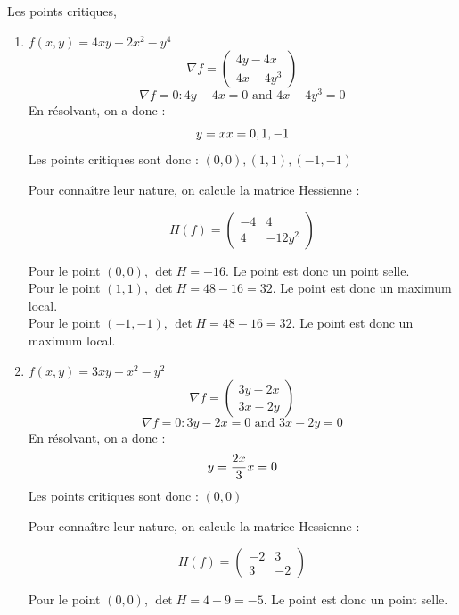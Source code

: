 \begin{solution}
    Les points critiques,
    \begin{enumerate}
        \item $f(x,y) = 4xy - 2x^2 - y^4$
        \[
        \nabla f = \begin{pmatrix}
        4y - 4x \\
        4x - 4y^3
        \end{pmatrix}
        \]
        \[
        \nabla f = 0 : 4y - 4x = 0 \text{ and } 4x - 4y^3 = 0
        \]
        En résolvant, on a donc : 
        \[
        y = x \\
        x = 0, 1, -1
        \]
        Les points critiques sont donc : $(0,0), (1,1), (-1,-1)$

        Pour connaître leur nature, on calcule la matrice Hessienne :

        \[ H(f) = \begin{pmatrix}
        -4 & 4 \\
        4 & -12 y^2
        \end{pmatrix}
        \]

        Pour le point $(0,0)$, $\det H = -16$. Le point est donc un point selle. \\
        Pour le point $(1,1)$, $\det H = 48 - 16 = 32$. Le point est donc un maximum local. \\
        Pour le point $(-1,-1)$, $\det H = 48 - 16 = 32$. Le point est donc un maximum local.
        
        \item $f(x,y) = 3xy - x^2 - y^2$
        \[
        \nabla f = \begin{pmatrix}
        3y - 2x \\
        3x - 2y
        \end{pmatrix}
        \]
        \[
        \nabla f = 0 : 3y - 2x = 0 \text{ and } 3x - 2y = 0
        \]
        En résolvant, on a donc : 
        \[
        y = \frac{2x}{3} \\
        x = 0
        \]
        Les points critiques sont donc : $(0,0)$

        Pour connaître leur nature, on calcule la matrice Hessienne :

        \[ H(f) = \begin{pmatrix}
        -2 & 3 \\
        3 & -2
        \end{pmatrix}
        \]

        Pour le point $(0,0)$, $\det H = 4 - 9 = -5$. Le point est donc un point selle. 
        

\end{enumerate}
\end{solution}
